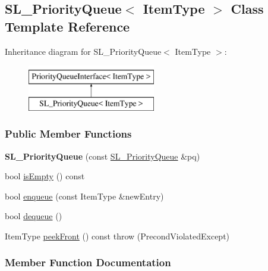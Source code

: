 \hypertarget{class_s_l___priority_queue}{}\subsection{S\+L\+\_\+\+Priority\+Queue$<$ Item\+Type $>$ Class Template Reference}
\label{class_s_l___priority_queue}
Inheritance diagram for S\+L\+\_\+\+Priority\+Queue$<$ Item\+Type $>$\+:\begin{figure}[H]
\begin{center}
\leavevmode
\includegraphics[height=2.000000cm]{class_s_l___priority_queue}
\end{center}
\end{figure}
\subsubsection*{Public Member Functions}
\begin{DoxyCompactItemize}
\item 
{\bfseries S\+L\+\_\+\+Priority\+Queue} (const \hyperlink{class_s_l___priority_queue}{S\+L\+\_\+\+Priority\+Queue} \&pq)\hypertarget{class_s_l___priority_queue_a2630a64cbd7376864bcd4fac9c65991e}{}\label{class_s_l___priority_queue_a2630a64cbd7376864bcd4fac9c65991e}

\item 
bool \hyperlink{class_s_l___priority_queue_a4502c0091ed41cbedc3fb25040ae2833}{is\+Empty} () const 
\item 
bool \hyperlink{class_s_l___priority_queue_a23d14a8e92ba404f771eb5e99aee3c77}{enqueue} (const Item\+Type \&new\+Entry)
\item 
bool \hyperlink{class_s_l___priority_queue_ac9ec261fab4c5834c5e9d1aeb15833c7}{dequeue} ()
\item 
Item\+Type \hyperlink{class_s_l___priority_queue_ade728bc676a9f65ab8cf70b4f498afa3}{peek\+Front} () const   throw (\+Precond\+Violated\+Except)
\end{DoxyCompactItemize}


\subsubsection{Member Function Documentation}
